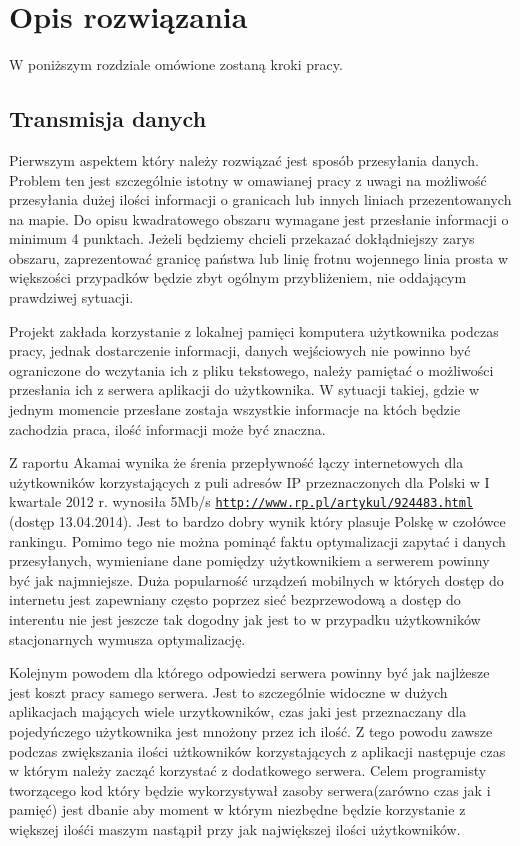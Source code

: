 \chapter{Opis rozwiązania}
\label{cha:Opis rozwiązania}

W poniższym rozdziale omówione zostaną kroki pracy.

\section{Transmisja danych}
\label{sec:transmisjaDanych}

Pierwszym aspektem który należy rozwiązać jest sposób przesyłania danych. Problem ten jest szczególnie istotny w omawianej pracy z uwagi na możliwość przesyłania dużej ilości informacji o granicach lub innych liniach przezentowanych na mapie. Do opisu kwadratowego obszaru wymagane jest przesłanie informacji o minimum 4 punktach. Jeżeli będziemy chcieli przekazać dokłądniejszy zarys obszaru, zaprezentować granicę państwa lub linię frotnu wojennego linia prosta w większości przypadków będzie zbyt ogólnym przybliżeniem, nie oddającym prawdziwej sytuacji.

Projekt zakłada korzystanie z lokalnej pamięci komputera użytkownika podczas pracy, jednak dostarczenie informacji, danych wejściowych nie powinno być ograniczone do wczytania ich z pliku tekstowego, należy pamiętać o możliwości przesłania ich z serwera aplikacji do użytkownika. W sytuacji takiej, gdzie w jednym momencie przesłane zostaja wszystkie informacje na któch będzie zachodzia praca, ilość informacji może być znaczna.

Z raportu Akamai wynika że śrenia przepływność łączy internetowych dla użytkowników korzystających z puli adresów IP przeznaczonych dla Polski w I kwartale 2012 r. wynosiła 5Mb/s  \underline{\texttt{http://www.rp.pl/artykul/924483.html}} (dostęp 13.04.2014). Jest to bardzo dobry wynik który plasuje Polskę w czołówce rankingu. Pomimo tego nie można pominąć faktu optymalizacji zapytać i danych przesyłanych, wymieniane dane pomiędzy użytkownikiem a serwerem powinny być jak najmniejsze. Duża popularność urządzeń mobilnych w których dostęp do internetu jest zapewniany często poprzez sieć bezprzewodową a dostęp do interentu nie jest jeszcze tak dogodny jak jest to w przypadku użytkowników stacjonarnych  wymusza optymalizację.

Kolejnym powodem dla którego odpowiedzi serwera powinny być jak najlżesze jest koszt pracy samego serwera. Jest to szczególnie widoczne w dużych aplikacjach mających wiele urzytkowników, czas jaki jest przeznaczany dla pojedyńczego użytkownika jest mnożony przez ich ilość. Z tego powodu zawsze podczas zwiększania ilości użtkowników korzystających z aplikacji następuje czas w którym należy zacząć korzystać z dodatkowego serwera. Celem programisty tworzącego kod który będzie wykorzystywał zasoby serwera(zarówno czas jak i pamięć) jest dbanie aby moment w którym niezbędne będzie korzystanie z większej ilośći maszym nastąpił przy jak największej ilości użytkowników.

